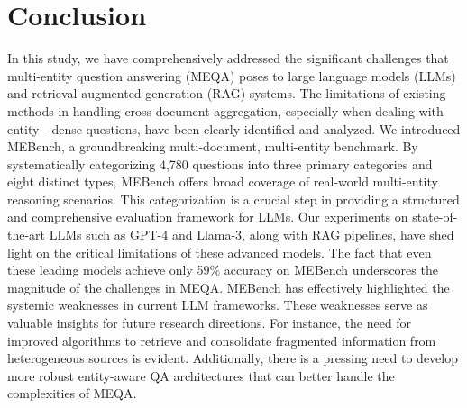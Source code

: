\section{Conclusion} 
In this study, we have comprehensively addressed the significant challenges that multi-entity question answering (MEQA) poses to large language models (LLMs) and retrieval-augmented generation (RAG) systems. The limitations of existing methods in handling cross-document aggregation, especially when dealing with entity - dense questions, have been clearly identified and analyzed. We introduced MEBench, a groundbreaking multi-document, multi-entity benchmark. By systematically categorizing 4,780 questions into three primary categories and eight distinct types, MEBench offers broad coverage of real-world multi-entity reasoning scenarios. This categorization is a crucial step in providing a structured and comprehensive evaluation framework for LLMs. Our experiments on state-of-the-art LLMs such as GPT-4 and Llama-3, along with RAG pipelines, have shed light on the critical limitations of these advanced models. The fact that even these leading models achieve only 59\% accuracy on MEBench underscores the magnitude of the challenges in MEQA. MEBench has effectively highlighted the systemic weaknesses in current LLM frameworks. These weaknesses serve as valuable insights for future research directions. For instance, the need for improved algorithms to retrieve and consolidate fragmented information from heterogeneous sources is evident. Additionally, there is a pressing need to develop more robust entity-aware QA architectures that can better handle the complexities of MEQA.